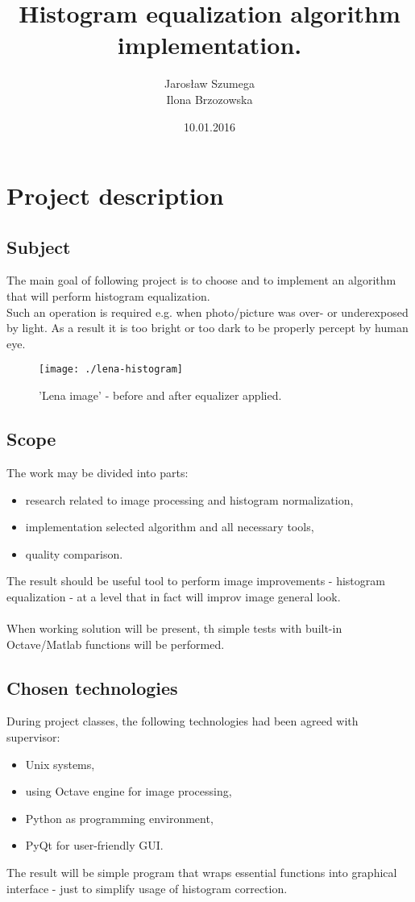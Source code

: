 \documentclass[eng,openany]{mgr}
\author{Jarosław Szumega\\Ilona Brzozowska}
\title{Histogram equalization algorithm implementation.}
\date{10.01.2016}
\begin{document}
\maketitle
\tableofcontents
\chapter{Project description}
\section{Subject}
The main goal of following project is to choose and to implement an algorithm that will perform histogram equalization.\\
Such an operation is required e.g. when photo/picture was over- or underexposed by light. As a result it is too bright or too dark to be properly percept by human eye.
\begin{figure}[h]
\centering
\texttt{[image: ./lena-histogram]}
\caption{'Lena image' - before and after equalizer applied.}
\label{fig:lena-histogram}
\end{figure}

\section{Scope}
The work may be divided into parts:
\begin{itemize}
\item research related to image processing and histogram normalization,
\item implementation selected algorithm and all necessary tools,
\item quality comparison.
\end{itemize}

The result should be useful tool to perform image improvements - histogram equalization - at a level that in fact will improv image general look.
\\
\\
When working solution will be present, th simple tests with built-in Octave/Matlab functions will be performed.

\section{Chosen technologies}
During project classes, the following technologies had been agreed with supervisor:
\begin{itemize}
\item Unix systems,
\item using Octave engine for image processing,
\item Python as programming environment,
\item PyQt for user-friendly GUI.
\end{itemize}
The result will be simple program that wraps essential functions into graphical interface - just to simplify usage of histogram correction.
\end{document}
